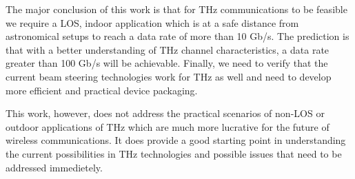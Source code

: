 \documentclass[12pt, letterpaper]{article}
\begin{document}
\par
The major conclusion of this work is that for THz communications to be feasible we require a LOS, indoor application which is at a safe distance from astronomical setups to reach a data rate of more than 10 Gb/s. The prediction is that with a better understanding of THz channel characteristics, a data rate greater than 100 Gb/s will be achievable. Finally, we need to verify that the current beam steering technologies work for THz as well and need to develop more efficient and practical device packaging. 
\par
This work, however, does not address the practical scenarios of non-LOS or outdoor applications of THz which are much more lucrative for the future of wireless communications. It does provide a good starting point in understanding the current possibilities in THz technologies and possible issues that need to be addressed immedietely.
\end{document}
